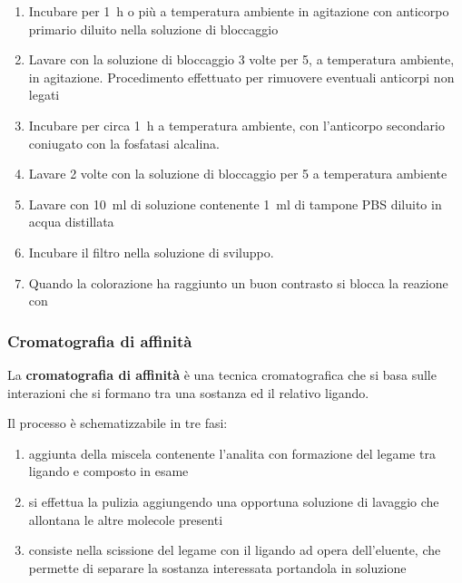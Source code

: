 \begin{enumerate}

	\item Incubare per \qty{1}{\hour} o più a temperatura ambiente in agitazione con anticorpo primario diluito nella soluzione di bloccaggio
	\item Lavare con la soluzione di bloccaggio 3 volte per \qty{5}{\min}, a temperatura ambiente, in agitazione. Procedimento effettuato per rimuovere eventuali anticorpi non legati
	\item Incubare per circa \qty{1}{\hour} a temperatura ambiente, con l’anticorpo secondario coniugato con la fosfatasi alcalina.
	\item Lavare 2 volte con la soluzione di bloccaggio per \qty{5}{\min} a temperatura ambiente
	\item Lavare con \qty{10}{\ml} di soluzione contenente \qty{1}{\ml} di tampone PBS diluito in acqua distillata
	\item Incubare il filtro nella soluzione di sviluppo.
	\item Quando la colorazione ha raggiunto un buon contrasto si blocca la reazione con 
\end{enumerate}

\subsubsection{Cromatografia di affinità}
\begin{Informazione}
	La \textbf{cromatografia di affinità} è una tecnica cromatografica che si basa sulle interazioni che si formano tra una sostanza ed il relativo ligando.

	\vspace*{.3cm}
	Il processo è schematizzabile in tre fasi:
	\begin{enumerate}[person]
		\item aggiunta della miscela contenente l'analita con formazione del legame tra ligando e composto in esame
		\item si effettua la pulizia aggiungendo una opportuna soluzione di lavaggio che allontana le altre molecole presenti
		\item consiste nella scissione del legame con il ligando ad opera dell'eluente, che permette di separare la sostanza interessata portandola in soluzione
	\end{enumerate}
\end{Informazione}

